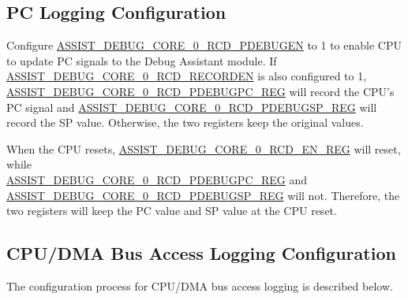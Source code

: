 \documentclass[main\_\_EN.tex]{subfiles}
\begin{document}
\subsection{PC Logging Configuration}

Configure \hyperref[fielddesc:ASSISTDEBUGCORE0RCDPDEBUGEN]{ASSIST\_DEBUG\_CORE\_0\_RCD\_PDEBUGEN} to 1 to enable CPU to update PC signals to the Debug Assistant module. If \hyperref[fielddesc:ASSISTDEBUGCORE0RCDRECORDEN]{ASSIST\_DEBUG\_CORE\_0\_RCD\_RECORDEN} is also configured to 1, \\\hyperref[regdesc:ASSISTDEBUGCORE0RCDPDEBUGPCREG]{ASSIST\_DEBUG\_CORE\_0\_RCD\_PDEBUGPC\_REG} will record the CPU's PC signal and \hyperref[regdesc:ASSISTDEBUGCORE0RCDPDEBUGSPREG]{ASSIST\_DEBUG\_CORE\_0\_RCD\_PDEBUGSP\_REG} will record the SP value. Otherwise, the two registers keep the original values.

When the CPU resets, \hyperref[regdesc:ASSISTDEBUGCORE0RCDENREG]{ASSIST\_DEBUG\_CORE\_0\_RCD\_EN\_REG} will reset, while \\ \hyperref[regdesc:ASSISTDEBUGCORE0RCDPDEBUGPCREG]{ASSIST\_DEBUG\_CORE\_0\_RCD\_PDEBUGPC\_REG}  and \hyperref[regdesc:ASSISTDEBUGCORE0RCDPDEBUGSPREG]{ASSIST\_DEBUG\_CORE\_0\_RCD\_PDEBUGSP\_REG} will not. Therefore, the two registers will keep the PC value and SP value at the CPU reset.

\subsection{CPU/DMA Bus Access Logging Configuration}

The configuration process for CPU/DMA bus access logging is described below.
\end{document}
